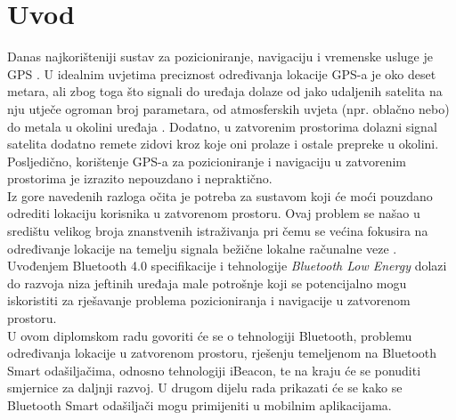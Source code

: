 \chapter{Uvod}

Danas najkorišteniji sustav za pozicioniranje, navigaciju i vremenske usluge je GPS . %
U idealnim uvjetima preciznost određivanja lokacije GPS-a je oko deset metara, ali zbog toga što signali do uređaja dolaze od jako udaljenih satelita na nju utječe ogroman broj parametara, od atmosferskih uvjeta (npr. oblačno nebo) do metala u okolini uređaja \citep{schneider2013}. 
Dodatno, u zatvorenim prostorima dolazni signal satelita dodatno remete zidovi kroz koje oni prolaze i ostale prepreke u okolini.
Posljedično, korištenje GPS-a za pozicioniranje i navigaciju u zatvorenim prostorima je izrazito nepouzdano i nepraktično.
\\

Iz gore navedenih razloga očita je potreba za sustavom koji će moći pouzdano odrediti lokaciju korisnika u zatvorenom prostoru. 
Ovaj problem se našao u središtu velikog broja znanstvenih istraživanja pri čemu se većina fokusira na određivanje lokacije na temelju signala bežične lokalne računalne veze . %
Uvođenjem Bluetooth 4.0 specifikacije i tehnologije \textit{Bluetooth Low Energy} dolazi do razvoja niza jeftinih uređaja male potrošnje koji se potencijalno mogu iskoristiti za rješavanje problema pozicioniranja i navigacije u zatvorenom prostoru.
\\

U ovom diplomskom radu govoriti će se o tehnologiji Bluetooth, problemu određivanja lokacije u zatvorenom prostoru, rješenju temeljenom na Bluetooth Smart odašiljačima, odnosno tehnologiji iBeacon, te na kraju će se ponuditi smjernice za daljnji razvoj. 
U drugom dijelu rada prikazati će se kako se Bluetooth Smart odašiljači mogu primijeniti u mobilnim aplikacijama.